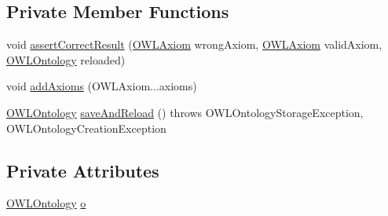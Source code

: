 \subsection*{Private Member Functions}
\begin{DoxyCompactItemize}
\item 
void \hyperlink{classorg_1_1semanticweb_1_1owlapi_1_1api_1_1test_1_1syntax_1_1_invalid_axiom_round_trip_test_case_a814e60de55eadb733d4f6835a91f3ca3}{assert\-Correct\-Result} (\hyperlink{interfaceorg_1_1semanticweb_1_1owlapi_1_1model_1_1_o_w_l_axiom}{O\-W\-L\-Axiom} wrong\-Axiom, \hyperlink{interfaceorg_1_1semanticweb_1_1owlapi_1_1model_1_1_o_w_l_axiom}{O\-W\-L\-Axiom} valid\-Axiom, \hyperlink{interfaceorg_1_1semanticweb_1_1owlapi_1_1model_1_1_o_w_l_ontology}{O\-W\-L\-Ontology} reloaded)
\item 
void \hyperlink{classorg_1_1semanticweb_1_1owlapi_1_1api_1_1test_1_1syntax_1_1_invalid_axiom_round_trip_test_case_a830ceb49a60b125df3a787f6c7b32421}{add\-Axioms} (O\-W\-L\-Axiom...\-axioms)
\item 
\hyperlink{interfaceorg_1_1semanticweb_1_1owlapi_1_1model_1_1_o_w_l_ontology}{O\-W\-L\-Ontology} \hyperlink{classorg_1_1semanticweb_1_1owlapi_1_1api_1_1test_1_1syntax_1_1_invalid_axiom_round_trip_test_case_ad810b181a86955f71fb4f624a26b5b30}{save\-And\-Reload} ()  throws O\-W\-L\-Ontology\-Storage\-Exception,             O\-W\-L\-Ontology\-Creation\-Exception 
\end{DoxyCompactItemize}
\subsection*{Private Attributes}
\begin{DoxyCompactItemize}
\item 
\hyperlink{interfaceorg_1_1semanticweb_1_1owlapi_1_1model_1_1_o_w_l_ontology}{O\-W\-L\-Ontology} \hyperlink{classorg_1_1semanticweb_1_1owlapi_1_1api_1_1test_1_1syntax_1_1_invalid_axiom_round_trip_test_case_ab04490ff7ad3820fb26397fa630cfd61}{o}
\end{DoxyCompactItemize}


